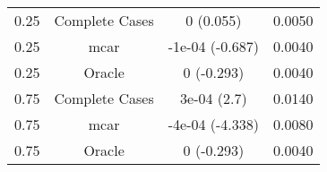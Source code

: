 \begin{table}[ht]
\centering
\begin{tabular}{cccc}
  \hline
  \hline
0.25 & Complete Cases & 0 (0.055) & 0.0050 \\ 
  0.25 & mcar & -1e-04 (-0.687) & 0.0040 \\ 
  0.25 & Oracle & 0 (-0.293) & 0.0040 \\ 
  0.75 & Complete Cases & 3e-04 (2.7) & 0.0140 \\ 
  0.75 & mcar & -4e-04 (-4.338) & 0.0080 \\ 
  0.75 & Oracle & 0 (-0.293) & 0.0040 \\ 
   \hline
\end{tabular}
\end{table}
